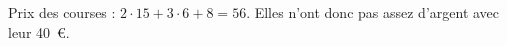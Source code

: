 %
%
    Prix des courses : $2 \cdot 15 + 3 \cdot 6 + 8 = 56$. Elles n'ont donc pas assez d'argent avec leur 40~€.

